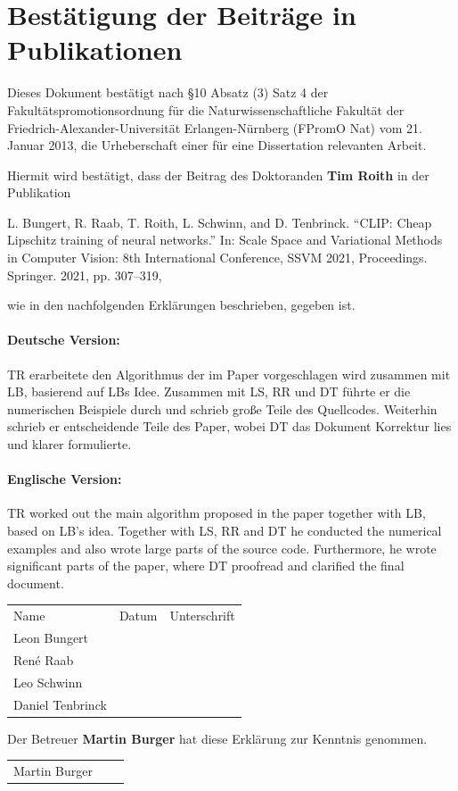 \documentclass[12pt]{article}
\begin{document}
\section*{Bestätigung der Beiträge in Publikationen}

Dieses Dokument bestätigt nach \S10 Absatz (3) Satz 4 der Fakultätspromotionsordnung für die Naturwissenschaftliche Fakultät der
Friedrich-Alexander-Universität Erlangen-Nürnberg (FPromO Nat) vom 21. Januar 2013, die Urheberschaft einer für eine Dissertation relevanten Arbeit.\par

\vspace{15pt}
\noindent
Hiermit wird bestätigt, dass der Beitrag des Doktoranden \textbf{Tim Roith} in der Publikation
%
\begin{center}
L. Bungert, R. Raab, T. Roith, L. Schwinn, and D. Tenbrinck. “CLIP:
Cheap Lipschitz training of neural networks.” In: Scale Space and Variational
Methods in Computer Vision: 8th International Conference, SSVM
2021, Proceedings. Springer. 2021, pp. 307–319,
\end{center}
%
wie in den nachfolgenden Erklärungen beschrieben, gegeben ist.

\paragraph{Deutsche Version:} TR erarbeitete den Algorithmus der im Paper vorgeschlagen wird zusammen mit LB, basierend auf LBs Idee. Zusammen mit LS, RR und DT führte er die numerischen Beispiele durch und schrieb große Teile des Quellcodes. Weiterhin schrieb er entscheidende Teile des Paper, wobei DT das Dokument Korrektur lies und klarer formulierte.

\paragraph{Englische Version:} TR worked out the main algorithm proposed in the paper together with LB, based on LB's idea. Together with LS, RR and DT he conducted the numerical examples and also wrote large parts of the source code. Furthermore, he wrote significant parts of the paper, where DT proofread and clarified the final document.
\vspace{30pt}

\renewcommand{\arraystretch}{3.5}
\begin{tabular}{l l l}
Name & Datum & Unterschrift\\
Leon Bungert & \raisebox{-3pt}{\makebox[5cm]{.\dotfill}} & \raisebox{-3pt}{\makebox[5cm]{.\dotfill}}\\
René Raab & \raisebox{-3pt}{\makebox[5cm]{.\dotfill}} & \raisebox{-3pt}{\makebox[5cm]{.\dotfill}}\\
%
Leo Schwinn & \raisebox{-3pt}{\makebox[5cm]{.\dotfill}} & \raisebox{-3pt}{\makebox[5cm]{.\dotfill}}\\
Daniel Tenbrinck & \raisebox{-3pt}{\makebox[5cm]{.\dotfill}} & \raisebox{-3pt}{\makebox[5cm]{.\dotfill}}\\
\end{tabular}%
%

\vspace{30pt}
\noindent
Der Betreuer \textbf{Martin Burger} hat diese Erklärung zur Kenntnis genommen.

\begin{tabular}{l l l}
	Martin Burger & \raisebox{-3pt}{\makebox[5cm]{.\dotfill}} & \raisebox{-3pt}{\makebox[5cm]{.\dotfill}}
\end{tabular}%

 
\end{document}
